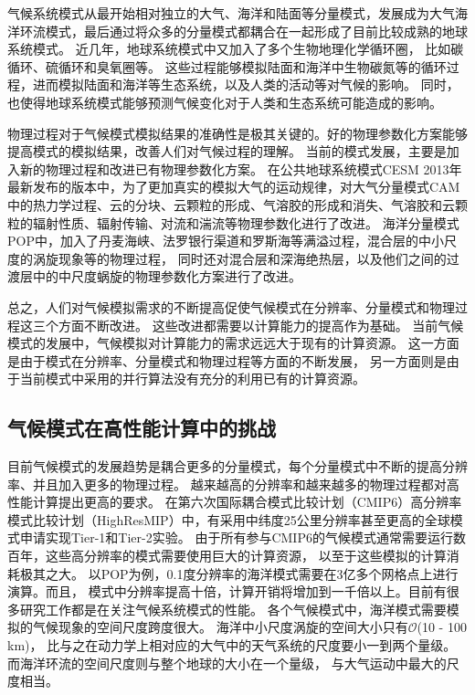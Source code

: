 气候系统模式从最开始相对独立的大气、海洋和陆面等分量模式，发展成为大气海洋环流模式，最后通过将众多的分量模式都耦合在一起形成了目前比较成熟的地球系统模式。
近几年，地球系统模式中又加入了多个生物地理化学循环圈， 比如碳循环、硫循环和臭氧圈等\cite{stocker2013ipcc}。
这些过程能够模拟陆面和海洋中生物碳氮等的循环过程，进而模拟陆面和海洋等生态系统，以及人类的活动等对气候的影响。
同时，也使得地球系统模式能够预测气候变化对于人类和生态系统可能造成的影响。

物理过程对于气候模式模拟结果的准确性是极其关键的。好的物理参数化方案能够提高模式的模拟结果，改善人们对气候过程的理解。 
当前的模式发展，主要是加入新的物理过程和改进已有物理参数化方案。 
在公共地球系统模式CESM 2013年最新发布的版本\cite{hurrell2013community}中，为了更加真实的模拟大气的运动规律，对大气分量模式CAM中的热力学过程、云的分块、云颗粒的形成、气溶胶的形成和消失、气溶胶和云颗粒的辐射性质、辐射传输、对流和湍流等物理参数化进行了改进。
海洋分量模式POP中，加入了丹麦海峡、法罗银行渠道和罗斯海等满溢过程，混合层的中小尺度的涡旋现象等的物理过程， 同时还对混合层和深海绝热层，以及他们之间的过渡层中的中尺度蜗旋的物理参数化方案进行了改进。
 
总之，人们对气候模拟需求的不断提高促使气候模式在分辨率、分量模式和物理过程这三个方面不断改进。
这些改进都需要以计算能力的提高作为基础。
当前气候模式的发展中，气候模拟对计算能力的需求远远大于现有的计算资源。
这一方面是由于模式在分辨率、分量模式和物理过程等方面的不断发展，
另一方面则是由于当前模式中采用的并行算法没有充分的利用已有的计算资源。


\subsection{气候模式在高性能计算中的挑战}

目前气候模式的发展趋势是耦合更多的分量模式，每个分量模式中不断的提高分辨率、并且加入更多的物理过程\cite{stocker2013ipcc}。
越来越高的分辨率和越来越多的物理过程都对高性能计算提出更高的要求。 
在第六次国际耦合模式比较计划（CMIP6）高分辨率模式比较计划（HighResMIP）中，有采用中纬度25公里分辨率甚至更高的全球模式申请实现Tier-1和Tier-2实验。 
由于所有参与CMIP6的气候模式通常需要运行数百年，这些高分辨率的模式需要使用巨大的计算资源， 以至于这些模拟的计算消耗极其之大。
以POP为例，0.1度分辨率的海洋模式需要在3亿多个网格点上进行演算。而且，
模式中分辨率提高十倍，计算开销将增加到一千倍以上。目前有很多研究工作都是在关注气候系统模式的性能\cite{Worley:2011:PCE:2063384.2063457,dennis2012computational}。 
各个气候模式中，海洋模式需要模拟的气候现象的空间尺度跨度很大。 
海洋中小尺度涡旋的空间大小只有$\mathcal{O}$(10 - 100 km)， 比与之在动力学上相对应的大气中的天气系统的尺度要小一到两个量级。
而海洋环流的空间尺度则与整个地球的大小在一个量级， 与大气运动中最大的尺度相当。



